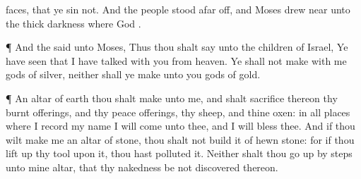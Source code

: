 {faces, that ye
sin not.
And the
people
stood afar
off, and
Moses drew
near unto the thick
darkness where
God
{}.
\par }{\PP {}¶ And the
{}
said unto
Moses, Thus thou shalt
say unto the
children of
Israel, Ye have
seen that I have
talked with you from
heaven.
Ye shall not
make with me
gods of
silver, neither shall ye
make unto you
gods of
gold.
\par }{\PP {}¶ An
altar of
earth thou shalt
make unto me, and shalt
sacrifice thereon thy burnt
offerings, and thy peace
offerings, thy
sheep, and thine
oxen: in all
places where I
record my
name I will
come unto thee, and I will
bless thee.
And if thou wilt
make me an
altar of
stone, thou shalt not
build it of hewn
stone: for if thou lift
up thy
tool upon it, thou hast
polluted it.
Neither shalt thou go
up by
steps unto mine
altar, that thy
nakedness be not
discovered thereon.

}
